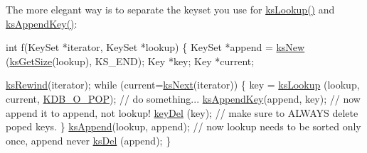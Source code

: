 The more elegant way is to separate the keyset you use for \hyperlink{group__keyset_gaa34fc43a081e6b01e4120daa6c112004}{ks\-Lookup()} and \hyperlink{group__keyset_gaa5a1d467a4d71041edce68ea7748ce45}{ks\-Append\-Key()}\-: 
\begin{DoxyCode}
\textcolor{keywordtype}{int} f(KeySet *iterator, KeySet *lookup)
\{
        KeySet *append = \hyperlink{group__keyset_ga671e1aaee3ae9dc13b4834a4ddbd2c3c}{ksNew} (\hyperlink{group__keyset_ga7474ad6b0a0fa969dbdf267ba5770eee}{ksGetSize}(lookup), KS\_END);
        Key *key;
        Key *current;

        \hyperlink{group__keyset_gabe793ff51f1728e3429c84a8a9086b70}{ksRewind}(iterator);
        \textcolor{keywordflow}{while} (current=\hyperlink{group__keyset_ga317321c9065b5a4b3e33fe1c399bcec9}{ksNext}(iterator))
        \{
                key = \hyperlink{group__keyset_gaa34fc43a081e6b01e4120daa6c112004}{ksLookup} (lookup, current, \hyperlink{group__keyset_gga98a3d6a4016c9dad9cbd1a99a9c2a45aa52fb5f2cc86773d393da62bebebf7984}{KDB\_O\_POP});
                \textcolor{comment}{// do something...}
                \hyperlink{group__keyset_gaa5a1d467a4d71041edce68ea7748ce45}{ksAppendKey}(append, key); \textcolor{comment}{// now append it to
       append, not lookup!}
                \hyperlink{group__key_ga3df95bbc2494e3e6703ece5639be5bb1}{keyDel} (key); \textcolor{comment}{// make sure to ALWAYS delete poped keys.}
        \}
        \hyperlink{group__keyset_ga21eb9c3a14a604ee3a8bdc779232e7b7}{ksAppend}(lookup, append);
        \textcolor{comment}{// now lookup needs to be sorted only once, append never}
        \hyperlink{group__keyset_ga27e5c16473b02a422238c8d970db7ac8}{ksDel} (append);
\}
\end{DoxyCode}



